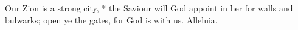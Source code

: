 Our Zion is a strong city, * the Saviour will God appoint in her for walls and bulwarks; open ye the gates, for God is with us. Alleluia.